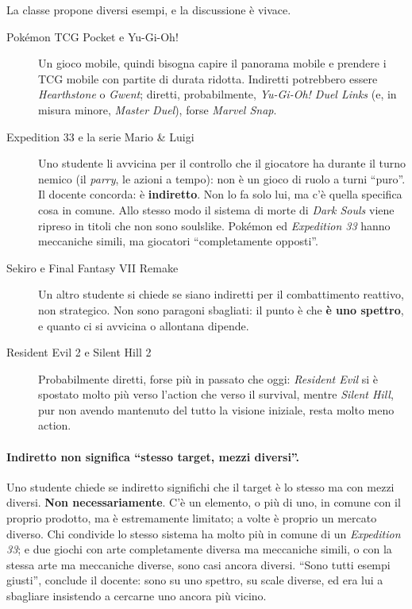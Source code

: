 La classe propone diversi esempi, e la discussione è vivace.
\begin{description}
  \item[Pokémon TCG Pocket e Yu-Gi-Oh!] Un gioco mobile, quindi bisogna
        capire il panorama mobile e prendere i TCG mobile con partite di
        durata ridotta. Indiretti potrebbero essere \emph{Hearthstone} o
        \emph{Gwent}; diretti, probabilmente, \emph{Yu-Gi-Oh! Duel Links} (e,
        in misura minore, \emph{Master Duel}), forse \emph{Marvel Snap}.
  \item[Expedition 33 e la serie Mario \& Luigi] Uno studente li avvicina per
        il controllo che il giocatore ha durante il turno nemico (il
        \emph{parry}, le azioni a tempo): non è un gioco di ruolo a turni
        ``puro''. Il docente concorda: è \textbf{indiretto}. Non lo fa solo
        lui, ma c'è quella specifica cosa in comune. Allo stesso modo il
        sistema di morte di \emph{Dark Souls} viene ripreso in titoli che non
        sono soulslike. Pokémon ed \emph{Expedition 33} hanno meccaniche
        simili, ma giocatori ``completamente opposti''.
  \item[Sekiro e Final Fantasy VII Remake] Un altro studente si chiede se
        siano indiretti per il combattimento reattivo, non strategico. Non
        sono paragoni sbagliati: il punto è che \textbf{è uno spettro}, e
        quanto ci si avvicina o allontana dipende.
  \item[Resident Evil 2 e Silent Hill 2] Probabilmente diretti, forse più in
        passato che oggi: \emph{Resident Evil} si è spostato molto più verso
        l'action che verso il survival, mentre \emph{Silent Hill}, pur non
        avendo mantenuto del tutto la visione iniziale, resta molto meno
        action.
\end{description}

\paragraph{Indiretto non significa ``stesso target, mezzi diversi''.} Uno
studente chiede se indiretto significhi che il target è lo stesso ma con
mezzi diversi. \textbf{Non necessariamente}. C'è un elemento, o più di uno, in
comune con il proprio prodotto, ma è estremamente limitato; a volte è
proprio un mercato diverso. Chi condivide lo stesso sistema ha molto più in
comune di un \emph{Expedition 33}; e due giochi con arte completamente diversa
ma meccaniche simili, o con la stessa arte ma meccaniche diverse, sono casi
ancora diversi. ``Sono tutti esempi giusti'', conclude il docente: sono su uno
spettro, su scale diverse, ed era lui a sbagliare insistendo a cercarne uno
ancora più vicino.

